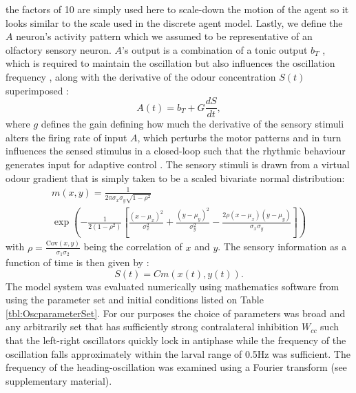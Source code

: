 \documentclass[11pt,a4paper]{article}
\newcommand{\Cov}{\mathrm{Cov}}
\newcommand{\todoKL}[1]{\todo[author=KL,color=blue!40, size=\tiny,inline]{#1}}
\begin{document}
 the factors of 10 are simply used here to scale-down the motion of the agent so it looks similar to the scale used in the discrete agent model.
Lastly, we define the $A$ neuron's activity pattern which we assumed to be representative of an olfactory sensory neuron. $A$'s output is a combination of a tonic output $b_T$ , which is required to maintain the oscillation but also influences the oscillation frequency \cite{lansner1997realistic}, along with the derivative of the odour concentration $S(t)$ superimposed : 
\begin{equation}
A(t) = b_T + G \frac{dS}{dt},
\end{equation}
where $g$ defines the gain defining how much the derivative of the sensory stimuli alters the firing  rate of input $A$, which perturbs the motor patterns and in turn influences the sensed stimulus in a closed-loop such that the rhythmic behaviour generates input for adaptive control \cite[see][]{willis1997centrally}.
The sensory stimuli is drawn from a virtual odour gradient that is simply taken to be a scaled bivariate normal distribution:
\begin{multline}
m(x,y) = \frac{1}{2 \pi  \sigma_x \sigma_y \sqrt{1-\rho^2}}\\
      \exp\left(
        -\frac{1}{2(1-\rho^2)}
        \left[
          \frac{(x-\mu_x)^2}{\sigma_x^2} + 
          \frac{(y-\mu_y)^2}{\sigma_y^2} -
          \frac{2\rho(x-\mu_x)(y-\mu_y)}{\sigma_x \sigma_y} \right]\right)
\label{eqn:bivariateNormal}
\end{multline}
with $\rho = \frac{\Cov(x,y)}{\sigma_1 \sigma_2}$ being the correlation of $x$ and $y$.
The sensory information as a function of time is then given by :
\begin{equation}
S(t) = C m(x(t),y(t)).
\label{eq:SensoryFunction}
\end{equation}
The model system was evaluated numerically using mathematics software from \cite{math}
using the parameter set and initial conditions listed on Table \ref{tbl:OscparameterSet}.
 For our purposes the choice of parameters was broad and any arbitrarily set that has sufficiently strong contralateral inhibition $W_{cc}$ such that the left-right oscillators quickly lock in antiphase while the frequency of the oscillation falls approximately within the larval range of 0.5Hz was sufficient. The frequency of the heading-oscillation was examined using a Fourier transform (see supplementary material).
\end{document}
